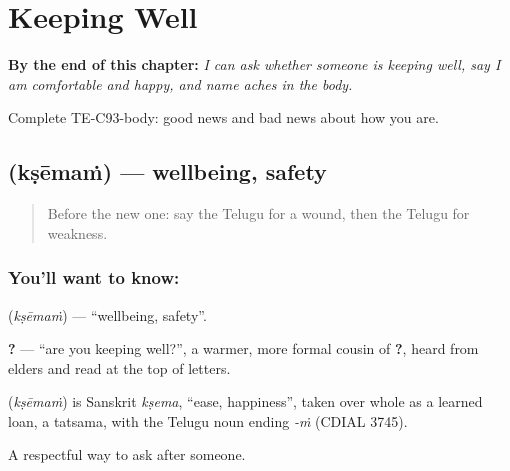 
\chapter{Keeping Well}
\label{ch:te-keeping-well}

\begin{chapteropening}
\textbf{By the end of this chapter:} \emph{I can ask whether someone is keeping well, say I am comfortable and happy, and name aches in the body.}

Complete TE-C93-body: good news and bad news about how you are.
\end{chapteropening}

\section[\texorpdfstring{\te{క్షేమం} (kṣēmaṁ)}{క్షేమం (kṣēmaṁ)}]{ (kṣēmaṁ) — wellbeing, safety}

\label{lesson:TE-C93-wellbeing}



\begin{quote}
Before the new one: say the Telugu for a wound, then the Telugu for weakness.
\end{quote}

\subsection*{You'll want to know: }
\textbf{} (\emph{kṣēmaṁ}) — \textquotedblleft{}wellbeing, safety\textquotedblright{}.

\textbf{ ?} — \textquotedblleft{}are you keeping well?\textquotedblright{}, a warmer, more formal cousin of \textbf{?}, heard from elders and read at the top of letters.

\begin{cousinweb}
\textbf{} (\emph{kṣēmaṁ}) is Sanskrit \emph{kṣema}, \textquotedblleft{}ease, happiness\textquotedblright{}, taken over whole as a learned loan, a tatsama, with the Telugu noun ending \emph{-ṁ} (CDIAL 3745).
\end{cousinweb}

\begin{grammarlens}[title={What you've built}]
A respectful way to ask after someone.
\end{grammarlens}

